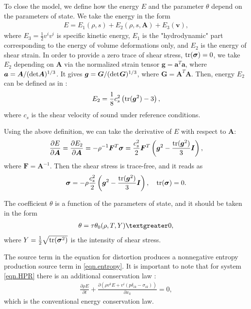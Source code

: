 \documentclass[3p,times,table]{article}
\renewcommand{\AA}{{\bm{A}}}
\renewcommand{\aa}{{\bm{a}}}
\renewcommand{\ggg}{{\bm{g}}}
\newcommand{\GG}{{\boldsymbol{G}}}
\newcommand{\vv}{{\bm{v}}}
\newcommand{\FF}{{\bm{F}}}
\newcommand{\tr}{\textnormal{tr}}
\begin{document}
To close the model, we define how the energy $E$ and the parameter $\theta$ depend on the parameters of state.
We take the energy in the form
\begin{align}
E=E_1(\rho,s)+E_2(\rho,s,\AA)+E_3(\vv), \label{energy}
\end{align}
where $E_3=\frac{1}{2}v^iv^i$ is specific kinetic energy,
$E_1$ is the "hydrodynamic" part corresponding to the energy of  volume deformations only,
and $E_2$ is the energy of shear strain.
In order to provide a zero trace of shear stress, $\tr (\bm{\sigma})=0$, we take 
$E_2$ depending on $\AA$ via the normalized strain tensor $\ggg=\aa^T\aa$, 
where 
$\aa=\AA/(\det\hspace{-0.6mm}\AA)^{1/3}$. It gives  
$\ggg=\GG/(\det\hspace{-0.4mm}\GG)^{1/3}$, where 
$\GG=\AA^T\AA$. Then, energy $ E_2 $ can be 
defined as in \cite{Ndanou2014}:
\begin{align}
E_2=\frac{1}{8}c_s^2\left(\tr({\ggg^2})-3\right),
\end{align}
where $c_s$ is the shear velocity of sound under reference conditions.

Using the above definition, we can take
the derivative of $E$ with respect to $\AA$:
\begin{align} \label{EderivA}
\frac{\partial E}{\partial \AA}=\frac{\partial E_2}{\partial 
\AA}=-\rho^{-1}\FF^T\bm{\sigma}=
\frac{c_s^2}{2} \bm{F}^T \left(\ggg^2-\frac{\tr({\ggg^2})}{3} \bm{I} \right),
\end{align}
where $\FF=\AA^{-1}$.
Then the shear stress is trace-free, and it reads as
\begin{align}
\bm{\sigma} =-\rho \frac{c_s^2}{2}\left(\ggg^2-\frac{\tr({\ggg^2})}{3} \bm{I}
\right), \quad  \tr(\bm{\sigma})=0.
\end{align} 

The coefficient $\theta$ is a function of the parameters of state, and it should be taken in the form 
\begin{align}
\theta = \tau \theta_0(\rho,T,Y) \textgreater 0,
\end{align}
where $Y=\frac{1}{2}\sqrt{\tr(\bm{\sigma}^2)}$ is the intensity of shear stress.

The source term in the equation for distortion produces a nonnegative entropy production source term in \eqref{eqn.entropy}. 
It is important to note that for system \eqref{eqn.HPR} there is an additional 
conservation law \cite{SHTC-GENERIC-CMAT}:
\begin{align} \label{eqn.energy}
\displaystyle\frac{\partial \rho E}{\partial t}+
\frac{\partial \left(\rho  v^k E +v^i(p \delta_{ik}-\sigma_{ik}) 
\right)}{\partial x_k}=0,
\end{align}
which is the conventional energy conservation law.
\end{document}
